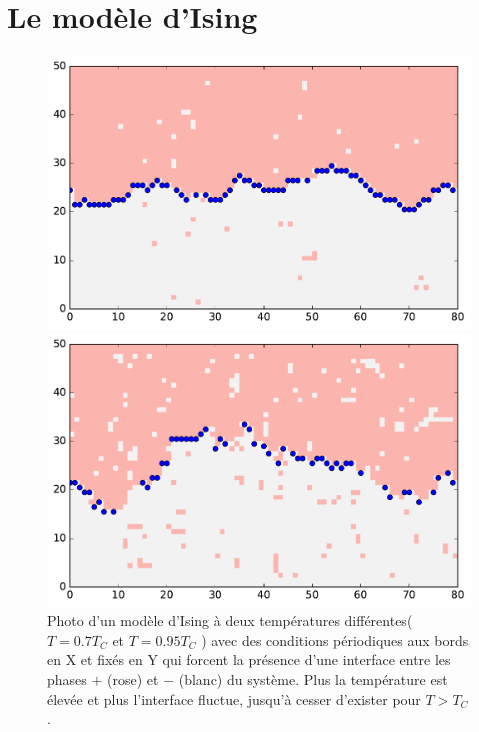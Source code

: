     \section{Le modèle d'Ising}
\begin{figure}
	\begin{minipage}[t]{0.5\linewidth}
		\includegraphics[width=\linewidth]{isingtosos/snap07.pdf}
	\end{minipage}%
	\begin{minipage}[t]{0.5\linewidth}
		\includegraphics[width=\linewidth]{isingtosos/snap09.pdf}
	\end{minipage}
	\caption{Photo d'un modèle d'Ising à deux températures différentes($T=0.7 T_C$ et $T=0.95 T_C$ ) avec des conditions périodiques aux bords en X et fixés en Y qui forcent la présence d'une interface entre les phases $+$ (rose) et $-$ (blanc) du système. Plus la température est élevée et plus l'interface fluctue, jusqu'à cesser d'exister pour $T \greater T_C$. }
	\label{amas-fixe}
\end{figure}  
  
